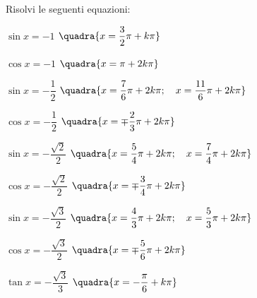 \begin{esercizio}\label{ese:03.1}
Risolvi le seguenti equazioni:
 \begin{enumeratea}
  \item $\sin x = -1$
   \hfill $\quadra{x = \dfrac{3}{2}\pi + k \pi}$
  \item $\cos x = -1$
   \hfill $\quadra{x = \pi + 2k \pi}$
  \item $\sin x = -\dfrac{1}{2}$
   \hfill $\quadra{x = \dfrac{7}{6}\pi + 2k \pi; \quad
                   x = \dfrac{11}{6}\pi + 2k \pi}$
  \item $\cos x = -\dfrac{1}{2}$
   \hfill $\quadra{x = \mp \dfrac{2}{3}\pi + 2k \pi}$
  \item $\sin x = -\dfrac{\sqrt{2}}{2}$
   \hfill $\quadra{x = \dfrac{5}{4}\pi + 2k \pi; \quad
                   x = \dfrac{7}{4}\pi + 2k \pi}$
  \item $\cos x = -\dfrac{\sqrt{2}}{2}$
   \hfill $\quadra{x = \mp \dfrac{3}{4}\pi + 2k \pi}$
  \item $\sin x = -\dfrac{\sqrt{3}}{2}$
   \hfill $\quadra{x = \dfrac{4}{3}\pi + 2k \pi; \quad
                   x = \dfrac{5}{3}\pi + 2k \pi}$
  \item $\cos x = -\dfrac{\sqrt{3}}{2}$
   \hfill $\quadra{x = \mp \dfrac{5}{6}\pi + 2k \pi}$
  \item $\tan x = -\dfrac{\sqrt{3}}{3}$
   \hfill $\quadra{x = -\dfrac{\pi}{6} + k \pi}$
 \end{enumeratea}
\end{esercizio}

